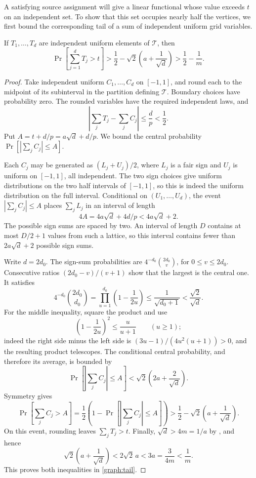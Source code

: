 A satisfying source assignment will give a linear functional whose
value exceeds \(t\) on an independent set. To show that this set
occupies nearly half the vertices, we first bound the corresponding
tail of a sum of independent uniform grid variables.

\begin{lemma}\label{graph:anticoncentration}
If $T_1,\ldots,T_d$ are independent uniform elements of $\mathcal T$,
then
\begin{equation}\label{graph:tail}
 \Pr\left[\sum_{j=1}^dT_j>t\right]
 >\frac12-\sqrt2\left(a+\frac1{\sqrt d}\right)
 >\frac12-\frac1m.
\end{equation}
\end{lemma}
\begin{proof}
Take independent uniform $C_1,\ldots,C_d$ on $[-1,1]$, and round each
to the midpoint of its subinterval in the partition defining
$\mathcal T$.  Boundary choices have probability zero.  The rounded
variables have the required independent laws, and
\[
 \left|\sum_jT_j-\sum_jC_j\right|\leq\frac dp<\frac12.
\]
Put $A=t+d/p=a\sqrt d+d/p$.  We bound the central probability
$\Pr[|\sum_jC_j|\leq A]$.

Each $C_j$ may be generated as $(L_j+U_j)/2$, where $L_j$ is a fair
sign and $U_j$ is uniform on $[-1,1]$, all independent.  The two sign
choices give uniform distributions on the two half intervals of
$[-1,1]$, so this is indeed the uniform distribution on the full
interval.  Conditional on $(U_1,\ldots,U_d)$, the event
$|\sum_jC_j|\leq A$ places $\sum_jL_j$ in an interval of length
\[
 4A=4a\sqrt d+4d/p<4a\sqrt d+2.
\]
The possible sign sums are spaced by two.  An interval of length
$D$ contains at most $D/2+1$ values from such a lattice, so this
interval contains fewer than $2a\sqrt d+2$ possible sign sums.

Write $d=2d_0$.  The sign-sum probabilities are
$4^{-d_0}\binom{2d_0}{v}$, for $0\leq v\leq2d_0$.
Consecutive ratios $(2d_0-v)/(v+1)$ show that the largest is the
central one.  It satisfies
\[
 4^{-d_0}\binom{2d_0}{d_0}
 =\prod_{u=1}^{d_0}\left(1-\frac1{2u}\right)
 \leq\frac1{\sqrt{d_0+1}}
 <\frac{\sqrt2}{\sqrt d}.
\]
For the middle inequality, square the product and use
\[
 \left(1-\frac1{2u}\right)^2\leq\frac{u}{u+1}
 \qquad(u\geq1);
\]
indeed the right side minus the left side is
$(3u-1)/(4u^2(u+1))>0$, and the resulting product telescopes.
The conditional central probability, and therefore its average,
is bounded by
\[
 \Pr\left[\left|\sum_jC_j\right|\leq A\right]
 <\sqrt2\left(2a+\frac2{\sqrt d}\right).
\]
Symmetry gives
\[
 \Pr\left[\sum_jC_j>A\right]
 =\frac12\left(1-
    \Pr\left[\left|\sum_jC_j\right|\leq A\right]\right)
 >\frac12-\sqrt2\left(a+\frac1{\sqrt d}\right).
\]
On this event, rounding leaves $\sum_jT_j>t$.  Finally,
$\sqrt d>4m=1/a$ by , and hence
\[
 \sqrt2\left(a+\frac1{\sqrt d}\right)
 <2\sqrt2\,a<3a=\frac3{4m}<\frac1m.
\]
This proves both inequalities in \eqref{graph:tail}.
\end{proof}

